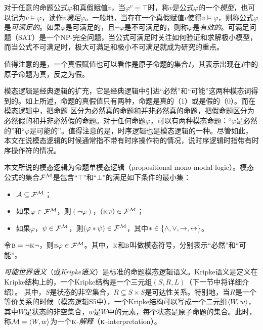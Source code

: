 对于任意的命题公式$\varphi$和真假赋值$v$，当$\varphi^v=\top$时，称$v$是公式$\varphi$的一个\emph{模型}，也可以记为$v \models \varphi$，读作$v$\emph{满足}$\varphi$。一般地，当存在一个真假赋值$v$使得$v\models \varphi$，则称公式$\varphi$是\emph{可满足的}。如果$\varphi$是可满足的，且$\neg \varphi$是不可满足的，则称$\varphi$是\emph{有效的}。可满足问题（SAT）是一个NP-完全问题，当公式可满足时关注如何验证和求解极小模型\cite{DBLP:conf/ijcai/Ben-Eliyahu-Zohary16,DBLP:conf/lpnmr/Ben-Eliyahu-Zohary17,zhangli2021}，而当公式不可满足时，极大可满足和极小不可满足就成为研究的重点\cite{DBLP:conf/ijcai/LeiC18,DBLP:conf/aaai/LeiC20}。

值得注意的是，一个真假赋值也可以看作是原子命题的集合$I$，其表示出现在$I$中的原子命题为真，反之为假。

模态逻辑是经典逻辑的扩充，它是经典逻辑中引进“必然”和“可能”这两种模态词得到的。如上所述，命题的真假值只有两种，命题是真的（1）或是假的（0）。而在模态逻辑中，把命题
区分为必然真的命题和并非必然真的命题，把假命题区分为必然假的和并非必然假的命题。对于任何命题$\varphi$，可以有两种模态命题：“$\varphi$是必然的”和“$\varphi$是可能的”。值得注意的是，时序逻辑也是模态逻辑的一种\cite{DBLP:books/daglib/0023036}。尽管如此，本文在说模态逻辑的时候通常指不带有时序操作符的情况，说时序逻辑时指带有时序操作符的情况。

本文所说的模态逻辑为命题单模态逻辑（propositional mono-modal logic）。模态公式的集合${\cal F}^{{\cal M}}$是包含“$\top$”和“$\bot$”的满足如下条件的最小集：
\begin{itemize}
	\item ${\cal A} \subseteq {\cal F}^{{\cal M}}$；
	\item 如果$\varphi \in {\cal F}^{{\cal M}}$，则$(\neg \varphi)$，$(\textsc{k} \varphi)\in {\cal F}^{{\cal M}}$；
	\item 如果$\varphi$，$\psi\in {\cal F}^{{\cal M}}$，则$(\varphi * \psi)\in {\cal F}^{{\cal M}}$，其中$*\in \{\wedge,\vee, \rightarrow, \leftrightarrow\}$。
\end{itemize}
令$\textsc{b} = \neg \textsc{k} \neg$，则$\textsc{b} \varphi \in {\cal F}^{{\cal M}}$。其中，$\textsc{k}$和$\textsc{b}$叫做模态符号，分别表示“必然”和“可能”。

\emph{可能世界语义}（或\emph{Kripke语义}）是标准的命题模态逻辑语义\cite{kripke1963semantical}。Kripke语义是定义在Kripke结构上的，一个Kripke结构是一个三元组$(S,R,L)$（下一节中将详细介绍）。
其中，$S$是状态的非空集合，$R\subseteq S \times S$是可达性关系。特别地，当$R$是一个等价关系的时候（模态逻辑S5中），一个Kripke结构可以写成一个二元组${\langle{W,w}\rangle}$，其中$W$是状态的非空集合，$w$是$W$中的元素，每个状态是原子命题的集合。此时，称${\cal M}={\langle{W,w}\rangle}$为一个$\textsc{k}$-\emph{解释}（$\textsc{k}$-interpretation）\cite{Yan:AIJ:2009}。

